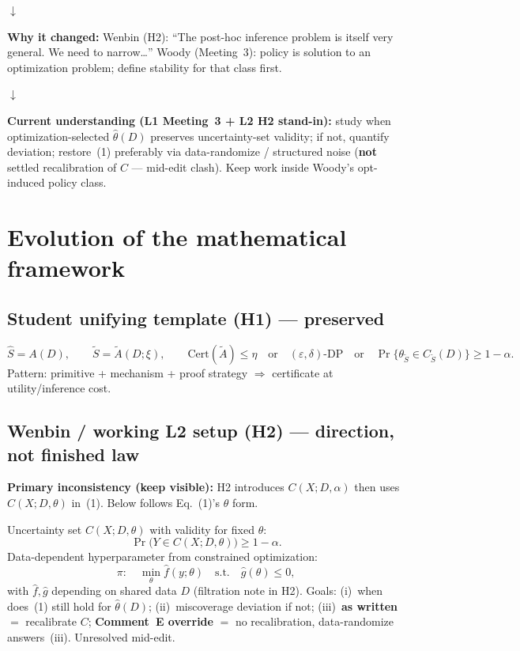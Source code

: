 \documentclass[11pt]{article}
\begin{document}
$\downarrow$

\textbf{Why it changed:}
Wenbin (H2): ``The post-hoc inference problem is itself very general. We need to narrow\ldots''
Woody (Meeting~3): policy is solution to an optimization problem; define stability for that
class first.

$\downarrow$

\textbf{Current understanding (L1 Meeting~3 + L2 H2 stand-in):}
study when optimization-selected $\hat\theta(D)$ preserves uncertainty-set validity; if not,
quantify deviation; restore~(1) preferably via data-randomize / structured noise
(\textbf{not} settled recalibration of $C$ --- mid-edit clash). Keep work inside Woody's
opt-induced policy class.

\section{Evolution of the mathematical framework}

\subsection{Student unifying template (H1) --- preserved}
\[
\hat S = A(D),\qquad
\tilde S = \tilde A(D;\xi),\qquad
\mathrm{Cert}(\tilde A)\le \eta
\quad\text{or}\quad
(\varepsilon,\delta)\text{-DP}
\quad\text{or}\quad
\Pr\{\theta_{\tilde S}\in C_{\tilde S}(D)\}\ge 1-\alpha.
\]
Pattern: primitive + mechanism + proof strategy $\Rightarrow$ certificate at utility/inference cost.

\subsection{Wenbin / working L2 setup (H2) --- direction, not finished law}
\textbf{Primary inconsistency (keep visible):} H2 introduces
$C(X;D,\alpha)$ then uses $C(X;D,\theta)$ in~(1). Below follows Eq.~(1)'s $\theta$ form.

Uncertainty set $C(X;D,\theta)$ with validity for fixed $\theta$:
\[
\Pr\bigl(Y\in C(X;D,\theta)\bigr)\ge 1-\alpha. \tag{1}
\]
Data-dependent hyperparameter from constrained optimization:
\[
\pi:\quad
\min_\theta \hat f(y;\theta)
\quad\text{s.t.}\quad
\hat g(\theta)\le 0, \tag{2}
\]
with $\hat f,\hat g$ depending on shared data $D$ (filtration note in H2).
Goals: (i)~when does~(1) still hold for $\hat\theta(D)$; (ii)~miscoverage deviation if not;
(iii)~\textbf{as written} $=$ recalibrate $C$; \textbf{Comment~E override} $=$ no recalibration,
data-randomize answers~(iii). Unresolved mid-edit.
\end{document}
